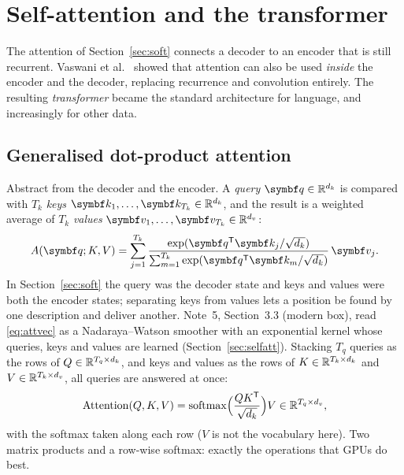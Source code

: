 \documentclass[11pt]{article}
\newcommand{\qv}{\vect{q}}
\newcommand{\kv}{\vect{k}}
\newcommand{\vv}{\vect{v}}
\newcommand{\softmax}{\operatorname{softmax}}
\begin{document}
\section{Self-attention and the transformer}\label{sec:transformer}

The attention of Section~\ref{sec:soft} connects a decoder to an encoder that is still recurrent. Vaswani et
al.~\cite{vaswani2017} showed that attention can also be used \emph{inside} the encoder and the decoder, replacing
recurrence and convolution entirely. The resulting \emph{transformer} became the standard architecture for language, and increasingly for
other data.

\subsection{Generalised dot-product attention}\label{sec:sdpa}

Abstract from the decoder and the encoder. A \emph{query} $\qv \in \R^{d_k}$ is compared with $T_k$ \emph{keys}
$\kv_1, \dots, \kv_{T_k} \in \R^{d_k}$, and the result is a weighted average of $T_k$ \emph{values} $\vv_1, \dots, \vv_{T_k} \in
\R^{d_v}$:
\begin{equation}\label{eq:attvec}
  A(\qv; K, V) = \sum_{j=1}^{T_k}\frac{\exp(\qv\T\kv_j/\sqrt{d_k})}{\sum_{m=1}^{T_k}\exp(\qv\T\kv_m/\sqrt{d_k})}\,\vv_j .
\end{equation}
In Section~\ref{sec:soft} the query was the decoder state and keys and values were both the encoder states; separating
keys from values lets a position be found by one description and deliver another. Note~5, Section~3.3 (modern box),
read \eqref{eq:attvec} as a Nadaraya--Watson smoother with an exponential kernel whose queries, keys and values are learned
(Section~\ref{sec:selfatt}). Stacking $T_q$ queries as the rows of $Q \in \mathbb{R}^{T_q \times d_k}$, and keys and values as the rows of
$K \in \mathbb{R}^{T_k \times d_k}$ and $V \in \mathbb{R}^{T_k \times d_v}$, all queries are answered at once:
\begin{equation}\label{eq:attmat}
  \mathrm{Attention}(Q, K, V) = \softmax\!\Big(\frac{QK\T}{\sqrt{d_k}}\Big)V \in \R^{T_q \times d_v},
\end{equation}
with the softmax taken along each row ($V$ is not the vocabulary here). Two matrix products and a row-wise softmax: exactly the operations that GPUs do best.
\end{document}
